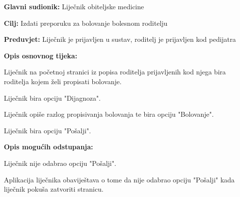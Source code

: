 					
					\noindent {}
					\begin{packed_item}
						
						\item \textbf{Glavni sudionik: }Liječnik obiteljske medicine
						\item  \textbf{Cilj:} Izdati preporuku za bolovanje bolesnom roditelju
						\item  \textbf{Preduvjet:} Liječnik je prijavljen u sustav, roditelj je prijavljen kod pedijatra
						\item  \textbf{Opis osnovnog tijeka:}
						
						\item[] \begin{packed_enum}
							
							\item Liječnik na početnoj stranici iz popisa roditelja prijavljenih kod njega bira roditelja kojem želi propisati bolovanje.
							\item Liječnik bira opciju "Dijagnoza".
							\item Liječnik opiše razlog propisivanja bolovanja te bira opciju "Bolovanje".
							\item Liječnik bira opciju "Pošalji".
						\end{packed_enum}
						
						\item  \textbf{Opis mogućih odstupanja:}
						
						\item[] \begin{packed_item}
							
							\item[4.a] Liječnik nije odabrao opciju "Pošalji".
							\item[] \begin{packed_enum}
								
								\item Aplikacija liječnika obaviještava o tome da nije odabrao opciju "Pošalji" kada liječnik pokuša zatvoriti stranicu.
							\end{packed_enum}
							
							
						\end{packed_item}
						
						
					\end{packed_item}
					
